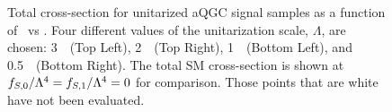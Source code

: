 \begin{figure}[ht!]
\caption{Total cross-section for unitarized aQGC signal samples as a function 
of \fszero~vs \fsone.
Four different values of the unitarization scale, $\Lambda$, are chosen: 3~\TeV~(Top Left),
2~\TeV~(Top Right), 1~\TeV~(Bottom Left), and 0.5~\TeV~(Bottom Right).
The total SM cross-section is shown at $f_{S,0}/\Lambda^4=f_{S,1}/\Lambda^4=0$ for comparison.
Those points that are white have not been evaluated.  }
\label{fig:aqgc_total_xsec_unitarized_3l}
\end{figure}

